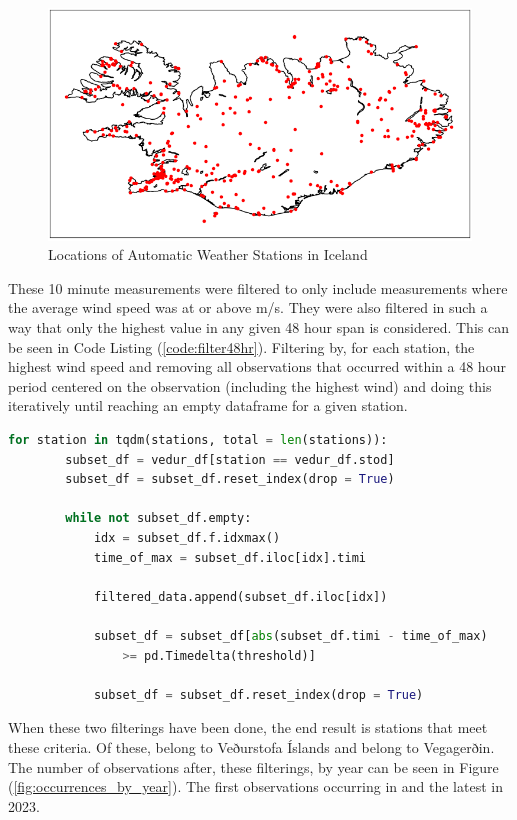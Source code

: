 \begin{figure}
    \caption{Locations of Automatic Weather Stations in Iceland}
    \label{fig:aws_map}
    \includegraphics[scale = 0.75]{Figures/weather_stations.png}
\end{figure}

These 10 minute measurements were filtered to only include measurements where the average wind speed was at or above \averageWindSpeedLimit m/s. They were also filtered in such a way that only the highest value in any given 48 hour span is considered. This can be seen in Code Listing (\ref{code:filter48hr}). Filtering by, for each station, the highest wind speed and removing all observations that occurred within a 48 hour period centered on the observation (including the highest wind) and doing this iteratively until reaching an empty dataframe for a given station.

\begin{lstlisting}[language = Python, caption = {Filter points over 48 hour interval}, label = code:filter48hr]
    for station in tqdm(stations, total = len(stations)):
        subset_df = vedur_df[station == vedur_df.stod]
        subset_df = subset_df.reset_index(drop = True)

        while not subset_df.empty:
            idx = subset_df.f.idxmax()
            time_of_max = subset_df.iloc[idx].timi

            filtered_data.append(subset_df.iloc[idx])

            subset_df = subset_df[abs(subset_df.timi - time_of_max)
                >= pd.Timedelta(threshold)]

            subset_df = subset_df.reset_index(drop = True)  
\end{lstlisting}

When these two filterings have been done, the end result is \nStationsCombined stations that meet these criteria. Of these, \nVedurMin belong to Veðurstofa Íslands and \nVGMin belong to Vegagerðin. The number of observations after, these filterings, by year can be seen in Figure (\ref{fig:occurrences_by_year}). The first observations occurring in \startDateVedur and the latest in 2023.

